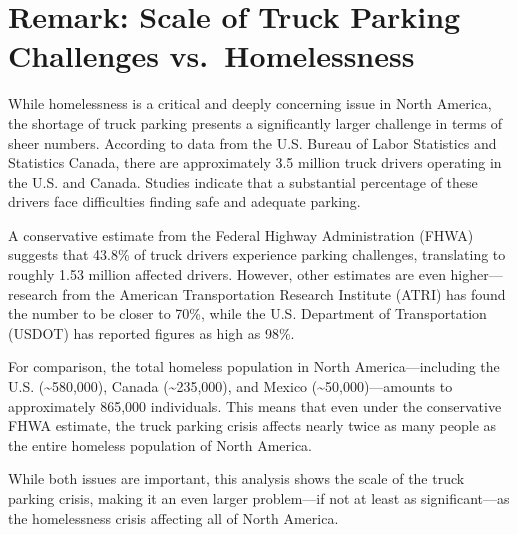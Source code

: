 \documentclass[
  12pt]{article}
\begin{document}
\section{Remark: Scale of Truck Parking Challenges
vs.~Homelessness}\label{remark-scale-of-truck-parking-challenges-vs.-homelessness}

While homelessness is a critical and deeply concerning issue in North
America, the shortage of truck parking presents a significantly larger
challenge in terms of sheer numbers. According to data from the U.S.
Bureau of Labor Statistics and Statistics Canada, there are
approximately 3.5 million truck drivers operating in the U.S. and
Canada. Studies indicate that a substantial percentage of these drivers
face difficulties finding safe and adequate parking.

A conservative estimate from the Federal Highway Administration (FHWA)
suggests that 43.8\% of truck drivers experience parking challenges,
translating to roughly 1.53 million affected drivers. However, other
estimates are even higher---research from the American Transportation
Research Institute (ATRI) has found the number to be closer to 70\%,
while the U.S. Department of Transportation (USDOT) has reported figures
as high as 98\%.

For comparison, the total homeless population in North
America---including the U.S. (\textasciitilde580,000), Canada
(\textasciitilde235,000), and Mexico (\textasciitilde50,000)---amounts
to approximately 865,000 individuals. This means that even under the
conservative FHWA estimate, the truck parking crisis affects nearly
twice as many people as the entire homeless population of North America.

While both issues are important, this analysis shows the scale of the
truck parking crisis, making it an even larger problem---if not at least
as significant---as the homelessness crisis affecting all of North
America.


  
\end{document}
